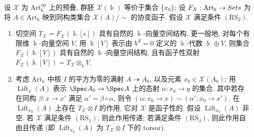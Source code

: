 \begin{lemma}\label{src:C.4.9}
设 $\mathcal X$ 为 $\mathrm{Art}_{\Bbbk}^{\mathrm{op}}$ 上的预叠, 群胚 $\mathcal X(\Bbbk)$ 等价于集合 $\{x_0\}$; 设 $F_{X}:\mathrm{Art}_{\Bbbk}\to Sets$ 为将 $A\in\mathrm{Art}_{\Bbbk}$ 映到同构类集合 $\mathcal X(A)/{\sim}$ 的协变函子. 假设 $\mathcal X$ 满足条件 $(\mathrm{RS}_2)$.
\begin{enumerate}[(1)]
\item 切空间 $T_{\mathcal X}=F_{\mathcal X}(\Bbbk[\epsilon])$ 具有自然的 $\Bbbk$-向量空间结构. 更一般地, 对每个有限维 $\Bbbk$-向量空间 $V$, 用 $\Bbbk[V]$ 表示由 $V^2=0$ 定义的 $\Bbbk$-代数 $\Bbbk\oplus V$, 则集合 $F_{\mathcal X}(\Bbbk[V])$ 具有自然的 $\Bbbk$-向量空间结构, 且有函子性双射 $F_{\mathcal X}(\Bbbk[V])=T_{\mathcal X}\otimes_{\Bbbk}V$.
\item 考虑 $\mathrm{Art}_{\Bbbk}$ 中核 $I$ 的平方为零的满射 $A\twoheadrightarrow A_0$, 以及元素 $x_0\in\mathcal X(A_0)$; 用 $\operatorname{Lift}_x(A)$ 表示 $\Spec A_0\to\Spec A$ 上的态射 $\alpha:x_0\to y$ 的集合, 其中若存在同构 $\beta:x\to x'$ 满足 $\alpha'=\beta\circ\alpha$, 则令 $(\alpha:x_0\to x)\sim(\alpha':x_0\to x')$. 在 $\operatorname{Lift}_{x_0}(A)$ 上存在 $T_{\mathcal X}\otimes I$ 的作用, 它对 $\mathcal X$ 是函子性的. 假设 $\operatorname{Lift}_{x_0}(A)$ 非空. 若 $\mathcal X$ 满足条件 $(\mathrm{RS}_1)$, 则此作用传递; 若满足条件 $(\mathrm{RS}_4)$, 则此作用自由且传递 (即 $\operatorname{Lift}_{x_0}(A)$ 为 $T_{\mathcal X}\otimes I$ 下的 torsor).
\end{enumerate}
\end{lemma}
